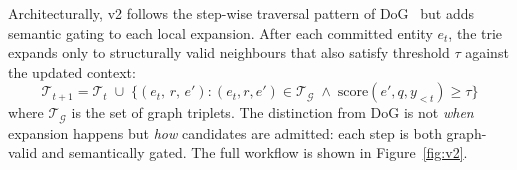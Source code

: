 Architecturally, v2 follows the step-wise traversal pattern of DoG~\citep{li2024-decoding-on-graphs} but adds semantic gating to each local expansion. After each committed entity $e_t$, the trie expands only to structurally valid neighbours that also satisfy threshold $\tau$ against the updated context:
\begin{equation}
  \mathcal{T}_{t+1} = \mathcal{T}_t \;\cup\; \bigl\{(e_t,\, r,\, e') :
  (e_t, r, e') \in \mathcal{T}_{\mathcal{G}} \;\wedge\;
  \text{score}(e', q, y_{<t}) \geq \tau\bigr\}
  \label{eq:v2expansion}
\end{equation}
where $\mathcal{T}_{\mathcal{G}}$ is the set of graph triplets. The distinction from DoG is not \textit{when} expansion happens but \textit{how} candidates are admitted: each step is both graph-valid and semantically gated. The full workflow is shown in Figure~\ref{fig:v2}.

